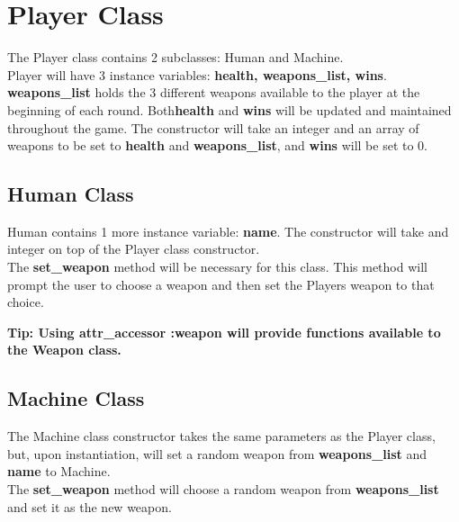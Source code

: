 \documentclass{article}
\begin{document}
\section*{Player Class}
The Player class contains 2 subclasses: Human and Machine. \\
Player will have 3 instance variables: \textbf{health, weapons\_list, wins}. \textbf{weapons\_list} holds the 3 different weapons available to the player at the beginning of each round. Both\textbf{health} and \textbf{wins} will be updated and maintained throughout the game. The constructor will take an integer and an array of weapons to be set to \textbf{health} and \textbf{weapons\_list}, and \textbf{wins} will be set to 0. \\

\subsection*{Human Class}
Human contains 1 more instance variable: \textbf{name}. The constructor will take and integer on top of the Player class constructor. \\
The \textbf{set\_weapon} method will be necessary for this class. This method will prompt the user to choose a weapon and then set the Players weapon to that choice. 

\textbf{Tip: Using attr\_accessor :weapon will provide functions available to the Weapon class.}

\subsection*{Machine Class}
The Machine class constructor takes the same parameters as the Player class, but, upon instantiation, will set a random weapon from \textbf{weapons\_list} and \textbf{name} to Machine. \\
The \textbf{set\_weapon} method will choose a random weapon from \textbf{weapons\_list} and set it as the new weapon. 

\end{document}
